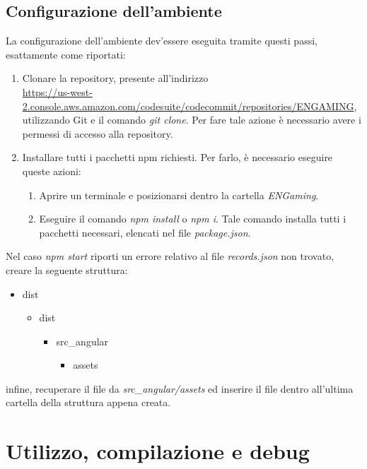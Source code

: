 \subsection{Configurazione dell'ambiente}
La configurazione dell'ambiente dev'essere eseguita tramite questi passi, esattamente come riportati:
\begin{enumerate}
    \item Clonare la repository, presente all'indirizzo \\ \href{https://us-west-2.console.aws.amazon.com/codesuite/codecommit/repositories/ENGAMING/browse?region=us-west-2}{https://us-west-2.console.aws.amazon.com/codesuite/codecommit/repositories/ENGAMING}, utilizzando Git e il comando \textit{git clone}. Per fare tale azione è necessario avere i permessi di accesso alla repository.
    \item Installare tutti i pacchetti npm richiesti. Per farlo, è necessario eseguire queste azioni: \begin{enumerate}
        \item Aprire un terminale e posizionarsi dentro la cartella \textit{ENGaming}.
        \item Eseguire il comando \textit{npm install} o \textit{npm i}. Tale comando installa tutti i pacchetti necessari, elencati nel file \textit{package.json}.
    \end{enumerate}
\end{enumerate}
Nel caso \textit{npm start} riporti un errore relativo al file \textit{records.json} non trovato, creare la seguente struttura:
\begin{itemize}
    \item dist \begin{itemize}
        \item dist \begin{itemize}
            \item src_angular \begin{itemize}
                \item assets
            \end{itemize}
        \end{itemize}
    \end{itemize}
\end{itemize}
infine, recuperare il file da \textit{src_angular/assets} ed inserire il file dentro all'ultima cartella della struttura appena creata.
\section{Utilizzo, compilazione e debug}
